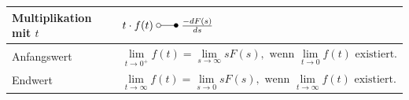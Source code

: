 \begin{tabular}{|p{2.5cm}|p{3cm}|p{2.5cm}p{10cm}|}
			\hline
			\hline
				\multicolumn{3}{|l}{Multiplikation mit $t$}  &
				$t\cdot f(t)  \; \laplace \; \frac{-d F(s)}{d s}$\\
			\hline
			\hline
				\multicolumn{3}{|l}{Anfangswert}   &  	 			$\lim\limits_{t\rightarrow 0^+} f(t) = \lim\limits_{s\rightarrow \infty} sF(s),\text{~wenn
				}  \lim\limits_{t\rightarrow 0} f(t)\text{~existiert}.$\\
			\hline
				\multicolumn{3}{|l}{Endwert}   & 	 			$\lim\limits_{t\rightarrow \infty} f(t) = \lim\limits_{s\rightarrow 0} sF(s),\text{~wenn
				}  \lim\limits_{t\rightarrow \infty} f(t)\text{~existiert}.$ \\ 
			\hline
		\end{tabular}
	\renewcommand{\arraystretch}{\arraystretchOriginal}
		
		
		
		
		
		
	
